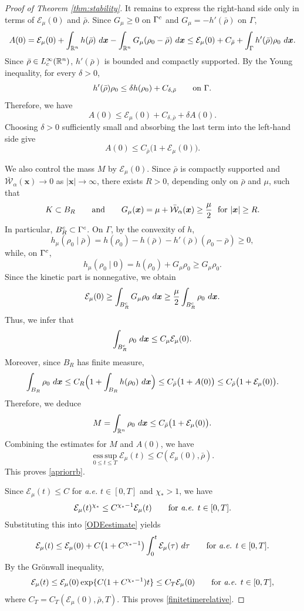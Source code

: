 \documentclass[10pt,a4paper]{amsart}
\def\dd{{\, \rm d}}
\begin{document}
\begin{proof}[Proof of {\rm Theorem \ref{thm:stability}}]
It remains to express the right-hand side only in terms of
$\mathcal E_\mu(0)$ and $\bar\rho$.  Since
$G_\mu\ge0$ on $\Gamma^{\rm c}$ and $G_\mu=-h'(\bar\rho)$ on $\Gamma$,
\[
\begin{aligned}
 A(0)=\mathcal E_\mu(0)
   +\int_{\mathbb R^n}h(\bar\rho)\,\dd\boldsymbol{x}
   -\int_{\mathbb R^n}G_\mu(\rho_0-\bar\rho)\,\dd\boldsymbol{x}\le
 \mathcal E_\mu(0)+C_{\bar\rho}
 +\int_{\Gamma}h'(\bar\rho)\rho_0\,\dd\boldsymbol{x}.
\end{aligned}
\]
Since $\bar\rho\in L^\infty_{\rm c}(\mathbb R^n)$, $h'(\bar\rho)$ is bounded
and compactly supported.  By the Young inequality, for every $\delta>0$,
\[
 h'(\bar\rho)\rho_0
 \le \delta h(\rho_0)+C_{\delta,\bar\rho}
 \qquad\hbox{on }\Gamma .
\]
Therefore, we have
\[
 A(0)\le \mathcal E_\mu(0)+C_{\delta,\bar\rho}+\delta A(0).
\]
Choosing $\delta>0$ sufficiently small and absorbing the last term into the
left-hand side give
\[
 A(0)\le C_{\bar\rho}\bigl(1+\mathcal E_\mu(0)\bigr).
\]

We also control the mass $M$ by $\mathcal E_\mu(0)$.  Since
$\bar\rho$ is compactly supported and
$\bar{\mathcal W}_\alpha(\boldsymbol{x})\to0$ as
$|\boldsymbol{x}|\to\infty$, there exists $R>0$, depending only on
$\bar\rho$ and $\mu$, such that
\[
 K\subset B_R
 \qquad\hbox{and}\qquad
 G_\mu(\boldsymbol{x})
 =\mu+\bar{\mathcal W}_\alpha(\boldsymbol{x})
 \ge \frac{\mu}{2}
 \,\,\,\,\hbox{for }|\boldsymbol{x}|\ge R .
\]
In particular, $B_R^{\rm c}\subset\Gamma^{\rm c}$.  
On $\Gamma$, by the convexity of
$h$,
\[
 h_\mu(\rho_0\mid\bar\rho)
 =h(\rho_0)-h(\bar\rho)-h'(\bar\rho)(\rho_0-\bar\rho)\ge0,
\]
while, on $\Gamma^{\rm c}$,
\[
 h_\mu(\rho_0\mid0)=h(\rho_0)+G_\mu\rho_0\ge G_\mu\rho_0 .
\]
Since the kinetic part is nonnegative, we obtain
\[
 \mathcal E_\mu(0)
 \ge
 \int_{B_R^{\rm c}}G_\mu\rho_0\,\dd\boldsymbol{x}
 \ge
 \frac{\mu}{2}\int_{B_R^{\rm c}}\rho_0\,\dd\boldsymbol{x}.
\]
Thus, we infer that
\[
 \int_{B_R^{\rm c}}\rho_0\,\dd\boldsymbol{x}
 \le C_\mu\mathcal E_\mu(0).
\]
Moreover, since $B_R$ has finite measure,
\[
 \int_{B_R}\rho_0\,\dd\boldsymbol{x}
 \le C_R\Big(1+\int_{B_R}h(\rho_0)\,\dd\boldsymbol{x}\Big)
 \le C_{\bar\rho}\bigl(1+A(0)\bigr)
 \le C_{\bar\rho}\bigl(1+\mathcal E_\mu(0)\bigr).
\]
Therefore, we deduce
\[
 M=\int_{\mathbb R^n}\rho_0\,\dd\boldsymbol{x}
 \le C_{\bar\rho}\bigl(1+\mathcal E_\mu(0)\bigr).
\]
Combining the estimates for $M$ and $A(0)$,  we have
\[
 \operatorname*{ess\,sup}_{0\le t\le T}\mathcal E_\mu(t)
 \le C(\mathcal E_\mu(0),\bar\rho).
\]
This proves \eqref{apriorrb}.


Since $\mathcal E_\mu(t)\le C$ for {\it a.e.} $t\in[0,T]$ and $\chi_*>1$, we have
\[
 \mathcal E_\mu(t)^{\chi_*}
 \le C^{\chi_*-1}\mathcal E_\mu(t)
 \qquad\hbox{for {\it a.e.} }t\in[0,T].
\]
Substituting this into \eqref{ODEestimate} yields
\[
 \mathcal E_\mu(t)
 \le \mathcal E_\mu(0)
 +C\bigl(1+C^{\chi_*-1}\bigr)\int_0^t\mathcal E_\mu(\tau)\,\dd\tau\qquad 
\hbox{for {\it a.e.} }t\in[0,T].
\]
By the Grönwall inequality,
\[
 \mathcal E_\mu(t)
 \le \mathcal E_\mu(0)\exp\{C(1+C^{\chi_*-1})t\}
 \le C_T\mathcal E_\mu(0)
 \qquad \hbox{for {\it a.e.} }t\in[0,T],
\]
where $C_T=C_T(\mathcal E_\mu(0), \bar{\rho}, T)$.  This proves \eqref{finitetimerelative}.
\end{proof}
\end{document}
